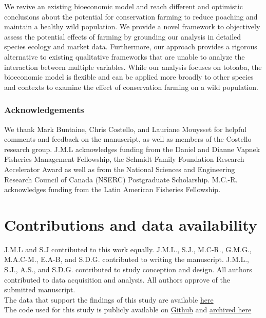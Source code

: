 We revive an existing bioeconomic model and reach different and optimistic conclusions about the potential for conservation farming to reduce poaching and maintain a healthy wild population. We provide a novel framework to objectively assess the potential effects of farming by grounding our analysis in detailed species ecology and market data. Furthermore, our approach provides a rigorous alternative to existing qualitative frameworks that are unable to analyze the interaction between multiple variables. While our analysis focuses on totoaba, the bioeconomic model is flexible and can be applied more broadly to other species and contexts to examine the effect of conservation farming on a wild population. 



\subsubsection*{Acknowledgements}
We thank Mark Buntaine, Chris Costello, and Lauriane Mouysset for helpful comments and feedback on the manuscript, as well as members of the Costello research group. J.M.L acknowledges funding from the Daniel and Dianne Vapnek Fisheries Management Fellowship, the Schmidt Family Foundation Research Accelerator Award as well as from the National Sciences and Engineering Research Council of Canada (NSERC) Postgraduate Scholarship. M.C.-R. acknowledges funding from the Latin American Fisheries Fellowship. 

\section*{Contributions and data availability}

J.M.L and S.J contributed to this work equally. J.M.L., S.J., M.C-R., G.M.G., M.A.C-M., E.A-B, and S.D.G. contributed to writing the manuscript. J.M.L., S.J., A.S., and S.D.G. contributed to study conception and design. All authors contributed to data acquisition and analysis. All authors approve of the submitted manuscript.
\\
The data that support the findings of this study are available  \href{https://doi.org/10.17605/OSF.IO/6Y8CQ}{here}
\\
The code used for this study is publicly available on \href{https://github.com/julawson/conservation_farming_totoaba}{Github} and \href{https://doi.org/10.17605/OSF.IO/6Y8CQ}{archived here}

